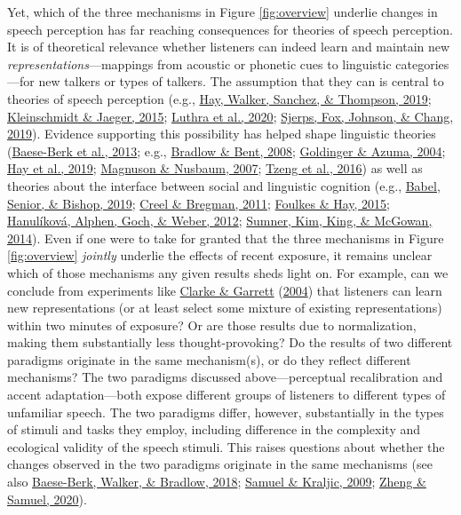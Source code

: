 \documentclass[
  11pt,
  english,
  man,floatsintext]{apa6}
\begin{document}
Yet, which of the three mechanisms in Figure \ref{fig:overview} underlie changes in speech perception has far reaching consequences for theories of speech perception. It is of theoretical relevance whether listeners can indeed learn and maintain new \emph{representations}---mappings from acoustic or phonetic cues to linguistic categories---for new talkers or types of talkers. The assumption that they can is central to theories of speech perception (e.g., \protect\hyperlink{ref-hay2019}{Hay, Walker, Sanchez, \& Thompson, 2019}; \protect\hyperlink{ref-kleinschmidt-jaeger2015}{Kleinschmidt \& Jaeger, 2015}; \protect\hyperlink{ref-luthra2020}{Luthra et al., 2020}; \protect\hyperlink{ref-sjerps2019}{Sjerps, Fox, Johnson, \& Chang, 2019}). Evidence supporting this possibility has helped shape linguistic theories (\protect\hyperlink{ref-baeseberk2013}{Baese-Berk et al., 2013}; e.g., \protect\hyperlink{ref-bradlow-bent2008}{Bradlow \& Bent, 2008}; \protect\hyperlink{ref-goldinger-azuma2004}{Goldinger \& Azuma, 2004}; \protect\hyperlink{ref-hay2019}{Hay et al., 2019}; \protect\hyperlink{ref-magnuson-nusbaum2007}{Magnuson \& Nusbaum, 2007}; \protect\hyperlink{ref-tzeng2016}{Tzeng et al., 2016}) as well as theories about the interface between social and linguistic cognition (e.g., \protect\hyperlink{ref-babel2019}{Babel, Senior, \& Bishop, 2019}; \protect\hyperlink{ref-creel-bregman2011}{Creel \& Bregman, 2011}; \protect\hyperlink{ref-foulkes-hay2015}{Foulkes \& Hay, 2015}; \protect\hyperlink{ref-hanulikova2012}{Hanulíková, Alphen, Goch, \& Weber, 2012}; \protect\hyperlink{ref-sumner2014}{Sumner, Kim, King, \& McGowan, 2014}). Even if one were to take for granted that the three mechanisms in Figure \ref{fig:overview} \emph{jointly} underlie the effects of recent exposure, it remains unclear which of those mechanisms any given results sheds light on. For example, can we conclude from experiments like \protect\hyperlink{ref-clarke-garrett2004}{Clarke \& Garrett} (\protect\hyperlink{ref-clarke-garrett2004}{2004}) that listeners can learn new representations (or at least select some mixture of existing representations) within two minutes of exposure? Or are those results due to normalization, making them substantially less thought-provoking? Do the results of two different paradigms originate in the same mechanism(s), or do they reflect different mechanisms? The two paradigms discussed above---perceptual recalibration and accent adaptation---both expose different groups of listeners to different types of unfamiliar speech. The two paradigms differ, however, substantially in the types of stimuli and tasks they employ, including difference in the complexity and ecological validity of the speech stimuli. This raises questions about whether the changes observed in the two paradigms originate in the same mechanisms (see also \protect\hyperlink{ref-baeseberk2018}{Baese-Berk, Walker, \& Bradlow, 2018}; \protect\hyperlink{ref-samuel-kraljic2009}{Samuel \& Kraljic, 2009}; \protect\hyperlink{ref-zheng-samuel2020}{Zheng \& Samuel, 2020}).
\end{document}
